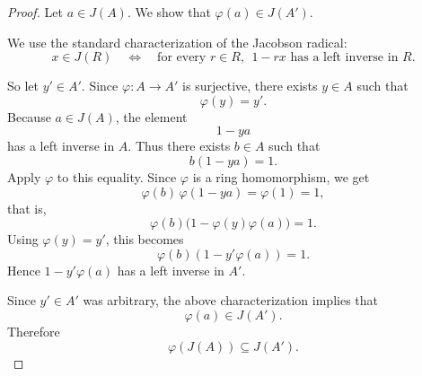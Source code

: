 \begin{proof}
    Let \(a\in J(A)\). We show that \(\varphi(a)\in J(A')\).

    We use the standard characterization of the Jacobson radical:
    \[
        x\in J(R)
        \quad\Longleftrightarrow\quad
        \text{for every } r\in R,\ \ 1-rx \text{ has a left inverse in } R.
    \]

    So let \(y'\in A'\). Since \(\varphi\colon A\to A'\) is surjective, there exists \(y\in A\)
    such that
    \[
        \varphi(y)=y'.
    \]
    Because \(a\in J(A)\), the element
    \[
        1-ya
    \]
    has a left inverse in \(A\). Thus there exists \(b\in A\) such that
    \[
        b(1-ya)=1.
    \]
    Apply \(\varphi\) to this equality. Since \(\varphi\) is a ring homomorphism, we get
    \[
        \varphi(b)\,\varphi(1-ya)=\varphi(1)=1,
    \]
    that is,
    \[
        \varphi(b)\bigl(1-\varphi(y)\varphi(a)\bigr)=1.
    \]
    Using \(\varphi(y)=y'\), this becomes
    \[
        \varphi(b)(1-y'\varphi(a))=1.
    \]
    Hence \(1-y'\varphi(a)\) has a left inverse in \(A'\).

    Since \(y'\in A'\) was arbitrary, the above characterization implies that
    \[
        \varphi(a)\in J(A').
    \]
    Therefore
    \[
        \varphi(J(A))\subseteq J(A').
    \]
\end{proof}

